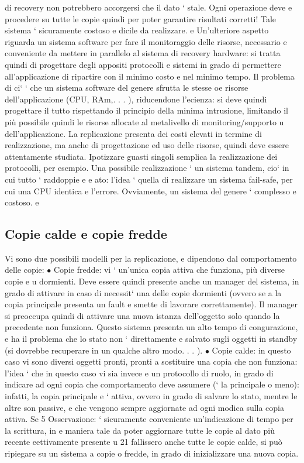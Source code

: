 \documentclass[a4paper,12pt]{article}
\begin{document}
di recovery non potrebbero accorgersi che il dato ` stale. Ogni operazione deve
e
procedere su tutte le copie quindi per poter garantire risultati corretti! Tale
sistema ` sicuramente costoso e dicile da realizzare.
e
Un'ulteriore aspetto riguarda un sistema software per fare il monitoraggio
delle risorse, necessario e conveniente da mettere in parallelo al sistema di recovery hardware: si tratta quindi di
progettare degli appositi protocolli e sistemi in
grado di permettere all'applicazione di ripartire con il minimo costo e nel minimo
tempo. Il problema di ci` ` che un sistema software del genere sfrutta le stesse
oe
risorse dell'applicazione (CPU, RAm,. . . ), riducendone l'ecienza: si deve quindi progettare il tutto rispettando il
principio della minima intrusione, limitando
il più possibile quindi le risorse allocate al metalivello di monitoring/supporto
u
dell'applicazione. La replicazione presenta dei costi elevati in termine di realizzazione, ma anche di progettazione ed
uso delle risorse, quindi deve essere
attentamente studiata. Ipotizzare guasti singoli semplica la realizzazione dei
protocolli, per esempio.
Una possibile realizzazione ` un sistema tandem, cio` in cui tutto ` raddoppie
e
e
ato: l'idea ` quella di realizzare un sistema fail-safe, per cui una CPU identica
e
l'errore. Ovviamente, un sistema del genere ` complesso e costoso.
e
\subsection{Copie calde e copie fredde}
Vi sono due possibili modelli per la replicazione, e dipendono dal comportamento
delle copie:
$\bullet$ Copie fredde: vi ` un'unica copia attiva che funziona, più diverse copie
e
u
dormienti. Deve essere quindi presente anche un manager del sistema, in
grado di attivare in caso di necessit` una delle copie dormienti (ovvero se
a
la copia principale presenta un fault e smette di lavorare correttamente).
Il manager si preoccupa quindi di attivare una nuova istanza dell'oggetto
solo quando la precedente non funziona. Questo sistema presenta un alto
tempo di congurazione, e ha il problema che lo stato non ` direttamente
e
salvato sugli oggetti in standby (si dovrebbe recuperare in un qualche altro
modo. . . ).
$\bullet$ Copie calde: in questo caso vi sono diversi oggetti pronti, pronti a sostituire una copia che non funziona:
l'idea ` che in questo caso vi sia invece
e
un protocollo di ruolo, in grado di indicare ad ogni copia che comportamento deve assumere (` la principale o meno):
infatti, la copia principale
e
` attiva, ovvero in grado di salvare lo stato, mentre le altre son passive,
e
che vengono sempre aggiornate ad ogni modica sulla copia attiva. Se
5 Osservazione: ` sicuramente conveniente un'indicazione di tempo per la scrittura, in
e
maniera tale da poter aggiornare tutte le copie al dato più recente eettivamente presente
u
21
fallissero anche tutte le copie calde, si può ripiegare su un sistema a copie
o
fredde, in grado di inizializzare una nuova copia.
\end{document}
